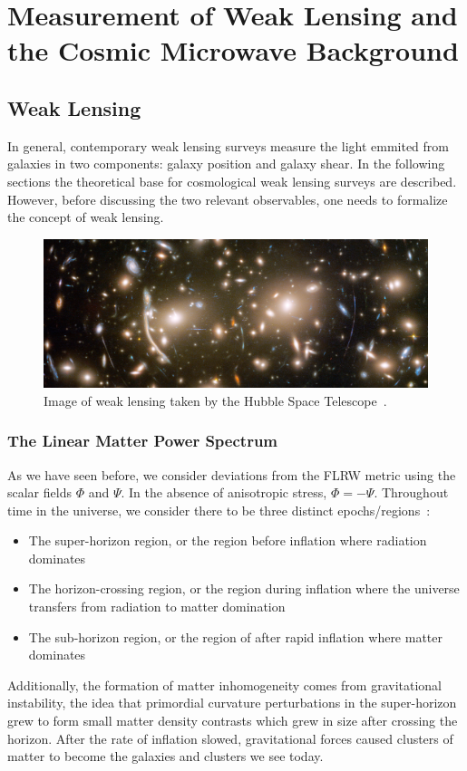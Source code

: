 \chapter{Measurement of Weak Lensing and the Cosmic Microwave Background}
\section{Weak Lensing}
In general, contemporary weak lensing surveys measure the light emmited from galaxies in two components: galaxy position and galaxy shear. In the following sections the theoretical base for cosmological weak lensing surveys are described. However, before discussing the two relevant observables, one needs to formalize the concept of weak lensing.
\begin{figure}[ht]
	\centering
	\includegraphics[width=\textwidth]{plots/hubble_weak_lensing.png}
	\caption{Image of weak lensing taken by the Hubble Space Telescope~\cite{hubble_lensing}.}
	\label{fig:weak_lensing}
\end{figure}
\subsection{The Linear Matter Power Spectrum}
As we have seen before, we consider deviations from the FLRW metric using the scalar fields $\Phi$ and $\Psi$. In the absence of anisotropic stress, $\Phi=-\Psi$. Throughout time in the universe, we consider there to be three distinct epochs/regions~\cite{scott_dodelson_modern_2021}:
\begin{itemize}
	\item The super-horizon region, or the region before inflation where radiation dominates
	\item The horizon-crossing region, or the region during inflation where the universe transfers from radiation to matter domination
	\item The sub-horizon region, or the region of after rapid inflation where matter dominates
\end{itemize}
Additionally, the formation of matter inhomogeneity comes from gravitational instability, the idea that primordial curvature perturbations in the super-horizon grew to form small matter density contrasts which grew in size after crossing the horizon. After the rate of inflation slowed, gravitational forces caused clusters of matter to become the galaxies and clusters we see today.

